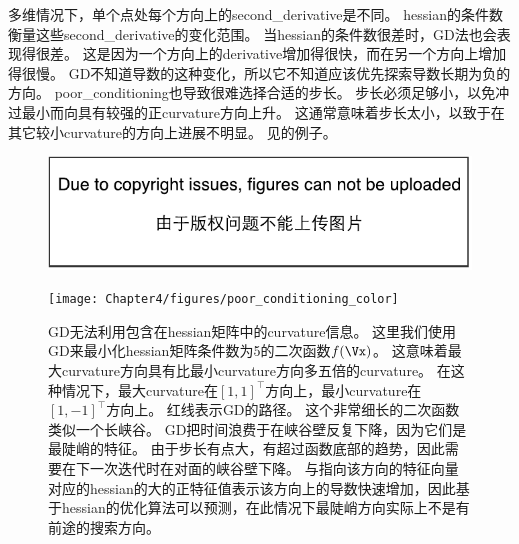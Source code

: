 多维情况下，单个点处每个方向上的\gls{second_derivative}是不同。
\gls{hessian}的条件数衡量这些\gls{second_derivative}的变化范围。
当\gls{hessian}的条件数很差时，\gls{GD}法也会表现得很差。
这是因为一个方向上的\gls{derivative}增加得很快，而在另一个方向上增加得很慢。
\gls{GD}不知道导数的这种变化，所以它不知道应该优先探索导数长期为负的方向。
\gls{poor_conditioning}也导致很难选择合适的步长。
步长必须足够小，以免冲过最小而向具有较强的正\gls{curvature}方向上升。
这通常意味着步长太小，以致于在其它较小\gls{curvature}的方向上进展不明显。
见的例子。
\begin{figure}[!htb]
\ifOpenSource
\centerline{\includegraphics{figure.pdf}}
\else
\centerline{\texttt{[image: Chapter4/figures/poor\_conditioning\_color]}}
\fi
\caption{\gls{GD}无法利用包含在\gls{hessian}矩阵中的\gls{curvature}信息。
这里我们使用\gls{GD}来最小化\gls{hessian}矩阵条件数为5的二次函数$f(\Vx)$。
这意味着最大\gls{curvature}方向具有比最小\gls{curvature}方向多五倍的\gls{curvature}。
在这种情况下，最大\gls{curvature}在$[1,1]^\top$方向上，最小\gls{curvature}在$[1,-1]^\top$方向上。
红线表示\gls{GD}的路径。
这个非常细长的二次函数类似一个长峡谷。
\gls{GD}把时间浪费于在峡谷壁反复下降，因为它们是最陡峭的特征。
由于步长有点大，有超过函数底部的趋势，因此需要在下一次迭代时在对面的峡谷壁下降。
与指向该方向的特征向量对应的\gls{hessian}的大的正特征值表示该方向上的导数快速增加，因此基于\gls{hessian}的优化算法可以预测，在此情况下最陡峭方向实际上不是有前途的搜索方向。
}
\label{fig:chap4_poor_conditioning_color}
\end{figure}


